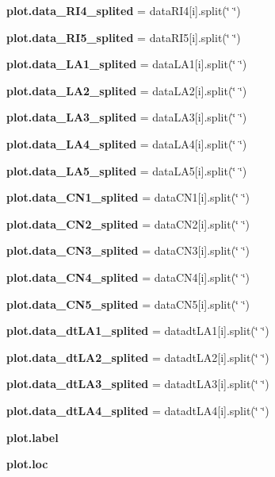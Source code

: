 \begin{DoxyCompactItemize}
\textbf{ plot.\+data\+\_\+\+R\+I4\+\_\+splited} = data\+R\+I4[i].split(\char`\"{} \char`\"{})
\item 
\textbf{ plot.\+data\+\_\+\+R\+I5\+\_\+splited} = data\+R\+I5[i].split(\char`\"{} \char`\"{})
\item 
\textbf{ plot.\+data\+\_\+\+L\+A1\+\_\+splited} = data\+L\+A1[i].split(\char`\"{} \char`\"{})
\item 
\textbf{ plot.\+data\+\_\+\+L\+A2\+\_\+splited} = data\+L\+A2[i].split(\char`\"{} \char`\"{})
\item 
\textbf{ plot.\+data\+\_\+\+L\+A3\+\_\+splited} = data\+L\+A3[i].split(\char`\"{} \char`\"{})
\item 
\textbf{ plot.\+data\+\_\+\+L\+A4\+\_\+splited} = data\+L\+A4[i].split(\char`\"{} \char`\"{})
\item 
\textbf{ plot.\+data\+\_\+\+L\+A5\+\_\+splited} = data\+L\+A5[i].split(\char`\"{} \char`\"{})
\item 
\textbf{ plot.\+data\+\_\+\+C\+N1\+\_\+splited} = data\+C\+N1[i].split(\char`\"{} \char`\"{})
\item 
\textbf{ plot.\+data\+\_\+\+C\+N2\+\_\+splited} = data\+C\+N2[i].split(\char`\"{} \char`\"{})
\item 
\textbf{ plot.\+data\+\_\+\+C\+N3\+\_\+splited} = data\+C\+N3[i].split(\char`\"{} \char`\"{})
\item 
\textbf{ plot.\+data\+\_\+\+C\+N4\+\_\+splited} = data\+C\+N4[i].split(\char`\"{} \char`\"{})
\item 
\textbf{ plot.\+data\+\_\+\+C\+N5\+\_\+splited} = data\+C\+N5[i].split(\char`\"{} \char`\"{})
\item 
\textbf{ plot.\+data\+\_\+dt\+L\+A1\+\_\+splited} = datadt\+L\+A1[i].split(\char`\"{} \char`\"{})
\item 
\textbf{ plot.\+data\+\_\+dt\+L\+A2\+\_\+splited} = datadt\+L\+A2[i].split(\char`\"{} \char`\"{})
\item 
\textbf{ plot.\+data\+\_\+dt\+L\+A3\+\_\+splited} = datadt\+L\+A3[i].split(\char`\"{} \char`\"{})
\item 
\textbf{ plot.\+data\+\_\+dt\+L\+A4\+\_\+splited} = datadt\+L\+A4[i].split(\char`\"{} \char`\"{})
\item 
\textbf{ plot.\+label}
\item 
\textbf{ plot.\+loc}
\end{DoxyCompactItemize}
